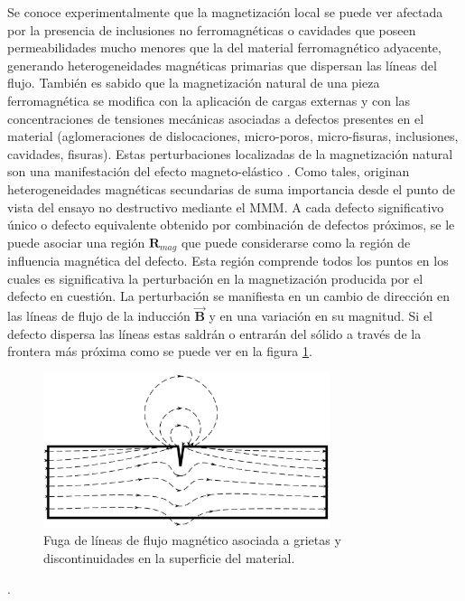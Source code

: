 Se conoce experimentalmente \citep{Lauer:1} que la magnetización local se puede ver afectada por la presencia de inclusiones no ferromagnéticas o cavidades que poseen permeabilidades mucho menores que la del material ferromagnético adyacente, generando heterogeneidades magnéticas primarias que dispersan las líneas del flujo. También es sabido \citep{Lauer:1} que la magnetización natural de una pieza ferromagnética se modifica con la aplicación de cargas externas y con las concentraciones de tensiones mecánicas asociadas a defectos presentes en el material (aglomeraciones de dislocaciones, micro-poros, micro-fisuras, inclusiones, cavidades, fisuras). Estas perturbaciones localizadas de la magnetización natural son una manifestación del efecto magneto-elástico \citep{MagnetoElastic}. Como tales, originan heterogeneidades magnéticas secundarias de suma importancia desde el punto de vista del ensayo no destructivo mediante el MMM. A cada defecto significativo único o defecto equivalente obtenido por combinación de defectos próximos, se le puede asociar una región $\mathit{\mathbf{R}}_{mag}$ que puede considerarse como la región de influencia magnética del defecto. Esta región comprende todos los puntos en los cuales es significativa la perturbación en la magnetización producida por el defecto en cuestión. La perturbación se manifiesta en un cambio de dirección en las líneas de flujo de la inducción $\vec{\mathit{\mathbf{B}}}$ y en una variación en su magnitud. Si el defecto dispersa las
líneas estas saldrán o entrarán del sólido a través de la frontera más próxima como se puede ver en la figura \ref{fig:MMM_dispersion}.

\begin{figure}[h]
	\centering
	\includegraphics[width=0.75\textwidth]{./Figures/MMM_dispersion.jpg}
	\caption{Fuga de líneas de flujo magnético asociada a grietas y discontinuidades en la superficie del material.}
	\label{fig:MMM_dispersion}
\end{figure}. 

